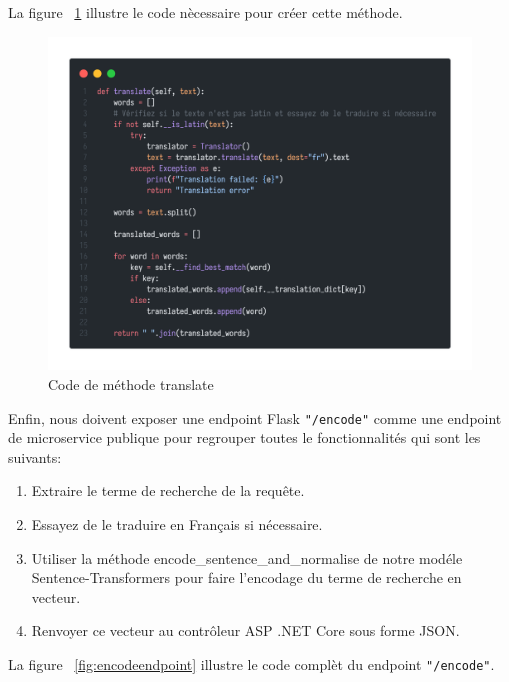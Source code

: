 \newpage
\noindent
La figure ~\ref{fig:translate} illustre le code nècessaire pour créer cette méthode.

\begin{figure}[H]
	\centering
	\includegraphics[width=1\textwidth]{logos/translate.png}
	\caption{Code de méthode translate}
	\label{fig:translate}
\end{figure}

\noindent
Enfin, nous doivent exposer une endpoint Flask \texttt{"/encode"} comme une endpoint de microservice publique pour regrouper toutes le fonctionnalités qui sont les suivants:
\begin{enumerate}
	\item Extraire le terme de recherche de la requête.
	\item Essayez de le traduire en Français si nécessaire.
	\item Utiliser la méthode encode\_sentence\_and\_normalise de notre modéle Sentence-Transformers pour faire l'encodage du terme de recherche en vecteur.
	\item Renvoyer ce vecteur au contrôleur ASP .NET Core sous forme JSON.
\end{enumerate}

La figure ~\ref{fig:encodeendpoint} illustre le code complèt du endpoint \texttt{"/encode"}.

